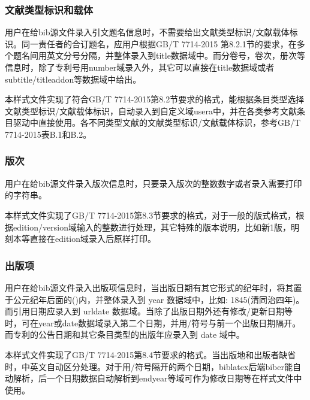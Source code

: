 \subsubsection{文献类型标识和载体}

\begin{property}{}{}
用户在给bib源文件录入引文题名信息时，不需要给出文献类型标识/文献载体标识。同一责任者的合订题名，应用户根据GB/T 7714-2015 第8.2.1节的要求，在多个题名间用英文分号分隔，并整体录入到title数据域中。而分卷号，卷次，册次等信息时，除了专利号用number域录入外，其它可以直接在title数据域或者subtitle/titleaddon等数据域中给出。

本样式文件实现了符合GB/T 7714-2015第8.2节要求的格式，能根据条目类型选择文献类型标识/文献载体标识，自动录入到自定义域usera中，并在各类参考文献条目驱动中直接使用。各不同类型文献的文献类型标识/文献载体标识，参考GB/T 7714-2015表B.1和B.2。
\end{property}

\subsubsection{版次}

\begin{property}{}{}
用户在给bib源文件录入版次信息时，只要录入版次的整数数字或者录入需要打印的字符串。

本样式文件实现了GB/T 7714-2015第8.3节要求的格式，对于一般的版式格式，根据edition/version域输入的整数进行处理，其它特殊的版本说明，比如新1版，明刻本等直接在edition域录入后原样打印。
\end{property}

\subsubsection{出版项}

\begin{property}{}{}
用户在给bib源文件录入出版项信息时，当出版日期有其它形式的纪年时，将其置于公元纪年后面的()内，并整体录入到 year 数据域中，比如: 1845(清同治四年)。而引用日期应录入到 urldate 数据域。当除了出版日期外还有修改/更新日期等时，可在year或date数据域录入第二个日期，并用/符号与前一个出版日期隔开。而专利的公告日期和其它条目类型的出版年应录入到 date 域中。

本样式文件实现了GB/T 7714-2015第8.4节要求的格式。当出版地和出版者缺省时，中英文自动区分处理。对于用/符号隔开的两个日期，biblatex后端biber能自动解析，后一个日期数据自动解析到endyear等域可作为修改日期等在样式文件中使用。
\end{property}

